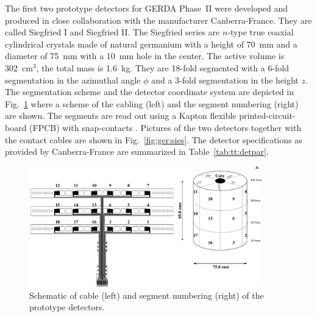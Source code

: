 The first two prototype detectors for GERDA Phase~II were developed
and produced in close collaboration with the manufacturer
Canberra-France. They are called Siegfried I and Siegfried II. The
Siegfried series are $n$-type true coaxial cylindrical crystals made
of natural germanium with a height of 70~mm and a diameter of 75~mm
with a 10~mm hole in the center. The active volume is 302~cm$^{3}$,
the total mass is 1.6~kg. They are 18-fold segmented with a 6-fold
segmentation in the azimuthal angle $\phi$ and a 3-fold segmentation
in the height $z$. The segmentation scheme and the detector coordinate
system are depicted in Fig.~\ref{fig:ger:segm} where a scheme of the
cabling (left) and the segment numbering (right) are shown. The
segments are read out using a Kapton flexible printed-circuit-board
(FPCB) with snap-contacts \cite{Sie07}. Pictures of the two detectors
together with the contact cables are shown in
Fig.~\ref{fig:ger:sies}. The detector specifications as provided by
Canberra-France are summarized in Table~\ref{tab:tt:detpar}.

\begin{figure}[tbhp]
\centering
\includegraphics[width=0.9\textwidth]{segmentation_scheme}  
\caption{Schematic of cable (left) and segment numbering (right) of
the prototype detectors.}
\label{fig:ger:segm}
\end{figure}

